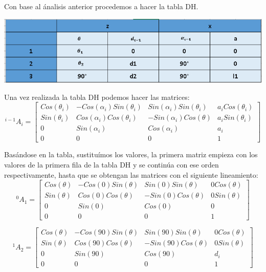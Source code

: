 \documentclass[11pt,a4paper,oldfontcommands,oneside]{memoir}
\begin{document}
Con base al ánalisis anterior procedemos a hacer la tabla DH. \\
\begin{center}
\includegraphics[scale=.65]{table.png} \\
\end{center}

Una vez realizada la tabla DH podemos hacer las matrices: \\

\[^{i-1}A_{i}= 
\begin{bmatrix}
    Cos(\theta_{i})       & -Cos(\alpha_{i})Sin(\theta_{i}) & Sin(\alpha_{i})Sin(\theta_{i}) & a_{i}Cos(\theta_{i}) \\
    
    Sin(\theta_{i})       & Cos(\alpha_{i})Cos(\theta_{i}) & -Sin(\alpha_{i})Cos(\theta)  & a_{i}Sin(\theta_{i}) \\
    
    0       & Sin(\alpha_{i}) & Cos(\alpha_{i}) & a_{i} \\
    
    0       & 0 & 0  & 1
\end{bmatrix}
\]

Basándose en la tabla, sustituímos los valores, la primera matriz empieza con los valores de la primera fila de la tabla DH y se continúa con ese orden respectivamente, hasta que se obtengan las matrices con el siguiente lineamiento: \\
\[^{0}A_{1}= 
\begin{bmatrix}
    Cos(\theta)       & -Cos(0)Sin(\theta) & Sin(0)Sin(\theta) & 0Cos(\theta) \\
    
    Sin(\theta)       & Cos(0)Cos(\theta) & -Sin(0)Cos(\theta)  & 0Sin(\theta) \\
    
    0       & Sin(0) & Cos(0) & 0 \\
    
    0       & 0 & 0  & 1
\end{bmatrix}
\]

\[^{1}A_{2}= 
\begin{bmatrix}
    Cos(\theta)       & -Cos(90)Sin(\theta) & Sin(90)Sin(\theta) & 0Cos(\theta) \\
    
    Sin(\theta)       & Cos(90)Cos(\theta) & -Sin(90)Cos(\theta)  & 0Sin(\theta) \\
    
    0       & Sin(90) & Cos(90) & d_{i} \\
    
    0       & 0 & 0  & 1
\end{bmatrix}
\]
\end{document}

